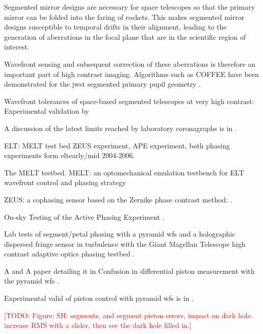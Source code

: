 \documentclass[letterpaper]{ar-1col}
\newcommand{\todo}[1]{\textcolor{red}{[TODO: #1]}}
\begin{document}
Segmented mirror designs are necessary for space telescopes so that the primary mirror can be folded into the faring of rockets.
%
%
This makes segmented mirror designs susceptible to temporal drifts in their alignment, leading to the generation of aberrations in the focal plane that are in the scientific region of interest.

Wavefront sensing and subsequent correction of these aberrations is therefore an important part of high contrast imaging.
%
Algorithms such as COFFEE have been demonstrated for the \ac{jwst} segmented primary pupil geometry \citep{Leboulleux20}.


Wavefront tolerances of space-based segmented telescopes at very high contrast: Experimental validation by \citet{Laginja22}

A discussion of the latest limits reached by laboratory coronagraphs is in \citet{Mennesson24}.

ELT: MELT test bed ZEUS experiment, APE experiment, both phasing experiments form \ac{elt}early/mid 2004-2006.

The MELT testbed. MELT: an optomechanical emulation testbench for ELT wavefront control and phasing strategy \citep{Pfrommer18}

ZEUS: a cophasing sensor based on the Zernike phase contrast method: \citep{Dohlen06}.

On-sky Testing of the Active Phasing Experiment  \citet{Gonte09}.


Lab tests of segment/petal phasing with a pyramid \ac{wfs} and a holographic dispersed fringe sensor in turbulence with the Giant Magellan Telescope high contrast adaptive optics phasing testbed \citep{Hedglen22}.

A and A paper detailing it in Confusion in differential piston measurement with the pyramid \ac{wfs} \citep{Bertrou-Cantou22}.

Experimental valid of piston control with pyramid \ac{wfs} is in \citet{Bertrou-Cantou23}. 


\todo{Figure: SH: segments, and segment piston errors, impact on dark hole. increase RMS with a slider, then see the dark hole filled in.}

\end{document}
